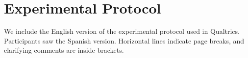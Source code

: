 \documentclass[11pt,a4paper,oneside]{article}
\begin{document}





    

\appendix
\section{Experimental Protocol}\label{instructions}
We include the English version of the experimental protocol used in Qualtrics. Participants saw the Spanish version. Horizontal lines indicate page breaks, and clarifying comments are inside brackets.
\end{document}
